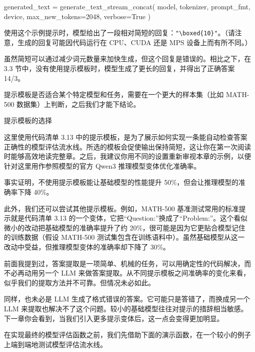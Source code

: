 \begin{codebox}
generated_text = generate_text_stream_concat(
    model, tokenizer, prompt_fmt, device,
    max_new_tokens=2048,
    verbose=True
)
\end{codebox}

使用这个示例提示时，模型给出了一段相对简短的回复：\texttt{"}\texttt{\textbackslash{}boxed\{10\}}\texttt{"}。（请注意，生成的回复可能因代码运行在 CPU、CUDA 还是 MPS 设备上而有所不同。）

虽然简短可以通过减少词元数量来加快生成，但这个回复是错误的。相比之下，在 3.3 节中，没有使用提示模板时，模型生成了更长的回复，并得出了正确答案 14/3。

提示模板是否适合某个特定模型和任务，需要在一个更大的样本集（比如 MATH-500 数据集）上判断，之后我们才能下结论。

\begin{mySidebar}{提示模板的选择}

这里使用代码清单 3.13 中的提示模板，是为了展示如何实现一条能自动检查答案正确性的模型评估流水线。所选的模板会促使输出保持简短，这让你在第一次阅读时能够高效地读完整章。之后，我建议你用不同的设置重新审视本章的示例，以便针对这里用作参照模型的官方 Qwen3 推理模型变体优化准确率。

事实证明，不使用提示模板能让基础模型的性能提升 50\%，但会让推理模型的准确率下降 40\%。

此外，我们还可以尝试其他提示模板。例如，MATH-500 基准测试常用的标准提示就是代码清单 3.13 的一个变体，它把“Question:”换成了“Problem:”。这个看似微小的改动把基础模型的准确率提升了约 20\%，很可能是因为它更贴合模型记住的训练数据（假设 MATH-500 测试集包含在训练语料中）。虽然基础模型从这一改动中受益，但推理模型变体的准确率却下降了 30\%。

前面我提到过，答案提取是一项简单、机械的任务，可以用确定性的代码解决，而不必再动用另一个 LLM 来做答案提取。从不同提示模板之间准确率的变化来看，似乎我们的提取方法并不可靠。但情况未必如此。

同样，也未必是 LLM 生成了格式错误的答案。它可能只是答错了，而换成另一个 LLM 来提取也解决不了这个问题。较小的基础模型往往对提示的措辞相当敏感。下一章你会看到，当我们引入更多提示变体后，这一点会变得更加明显。

\end{mySidebar}

在实现最终的模型评估函数之前，我们先借助下面的演示函数，在一个较小的例子上端到端地测试模型评估流水线。

